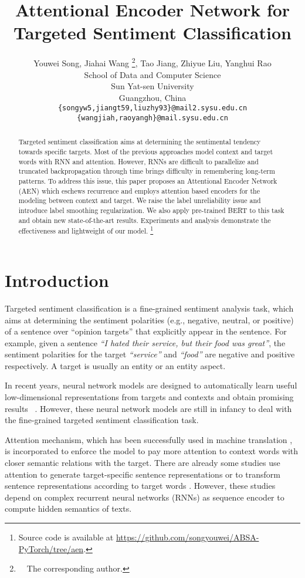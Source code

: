 \documentclass[11pt,a4paper]{article}
\title{Attentional Encoder Network for Targeted Sentiment Classification}
\author{Youwei Song, Jiahai Wang \thanks{~~The corresponding author.}, Tao Jiang, Zhiyue Liu, Yanghui Rao \\
  School of Data and Computer Science \\
  Sun Yat-sen University \\
  Guangzhou, China \\
  {\tt \{songyw5,jiangt59,liuzhy93\}@mail2.sysu.edu.cn} \\
  {\tt \{wangjiah,raoyangh\}@mail.sysu.edu.cn} \\
}
\date{}
\begin{document}
\maketitle

\begin{abstract}
Targeted sentiment classification aims at determining the sentimental tendency towards specific targets. Most of the previous approaches model context and target words with RNN and attention.
However, RNNs are difficult to parallelize and truncated backpropagation through time brings difficulty in remembering long-term patterns.
To address this issue, this paper proposes an Attentional Encoder Network (AEN) which eschews recurrence and employs attention based encoders for the modeling between context and target.
We raise the label unreliability issue and introduce label smoothing regularization.
We also apply pre-trained BERT to this task and obtain new state-of-the-art results.
Experiments and analysis demonstrate the effectiveness and lightweight of our model.
\footnote{Source code is available at \url{https://github.com/songyouwei/ABSA-PyTorch/tree/aen}.}
\end{abstract}

\section{Introduction}

Targeted sentiment classification is a fine-grained sentiment analysis task, which aims at determining the sentiment polarities (e.g., negative, neutral, or positive) of a sentence over ``opinion targets'' that explicitly appear in the
sentence. For example, given a sentence \textit{``I hated their service, but their food was great''}, the sentiment polarities for the target \textit{``service''} and \textit{``food''} are negative and positive respectively.
A target is usually an entity or an entity aspect.

In recent years, neural network models are designed to automatically learn useful low-dimensional representations from targets and contexts and obtain promising results ~\cite{dong2014adaptive,tang2016effective}.
However, these neural network models are still in infancy to deal with the fine-grained targeted sentiment classification task.

Attention mechanism, which has been successfully used in
machine translation \cite{bahdanau2014neural}, is incorporated to enforce the model to pay more attention to context words with closer semantic relations with the target.
There are already some studies use attention to generate target-specific sentence representations \cite{wang2016attention,ma2017interactive,chen2017recurrent}
or to transform sentence representations according to target words \cite{li2018transformation}.
However, these studies depend on complex recurrent neural networks (RNNs)
as sequence encoder to compute hidden semantics of texts.
\end{document}
